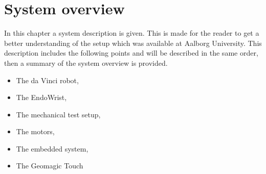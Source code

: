 \chapter{System overview}\label{cha:overview}

In this chapter a system description is given. This is made for the reader to get a better understanding of the setup which was available at Aalborg University. This description includes the following points and will be described in the same order, then a summary of the system overview is provided.

\begin{itemize}
  \item The da Vinci robot,
  \item The EndoWrist,
  \item The mechanical test setup,  
  \item The motors,
  \item The embedded system,
  \item The Geomagic Touch
\end{itemize}











%

%




%





